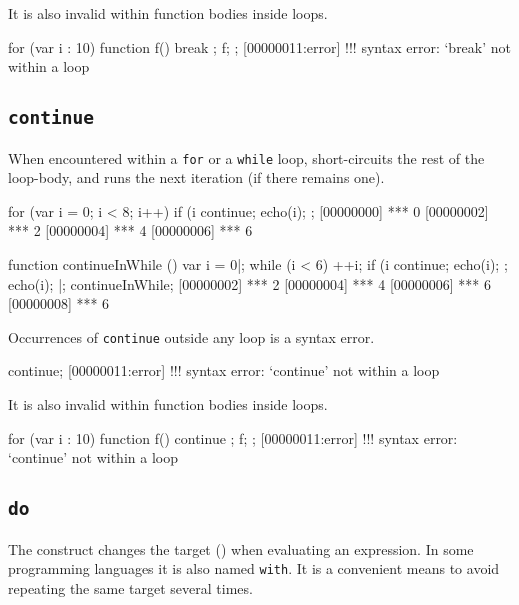 It is also invalid within function bodies inside loops.

\begin{urbiscript}
for (var i : 10)
{
  function f() { break };
  f;
};
[00000011:error] !!! syntax error: `break' not within a loop
\end{urbiscript}


\subsection{\lstinline{continue}}
\label{sec:lang:continue}

When encountered within a \lstinline{for} or a \lstinline{while} loop,
 short-circuits the rest of the loop-body, and runs the
next iteration (if there remains one).

\begin{urbiscript}
for (var i = 0; i < 8; i++)
{
  if (i %
    continue;
  echo(i);
};
[00000000] *** 0
[00000002] *** 2
[00000004] *** 4
[00000006] *** 6
\end{urbiscript}

\begin{urbiscript}
function continueInWhile ()
{
  var i = 0|;
  while (i < 6)
  {
    ++i;
    if (i %
      continue;
    echo(i);
  };
  echo(i);
}|;
continueInWhile;
[00000002] *** 2
[00000004] *** 4
[00000006] *** 6
[00000008] *** 6
\end{urbiscript}

Occurrences of \lstinline{continue} outside any loop is a syntax error.

\begin{urbiscript}
continue;
[00000011:error] !!! syntax error: `continue' not within a loop
\end{urbiscript}

It is also invalid within function bodies inside loops.

\begin{urbiscript}
for (var i : 10)
{
  function f() { continue };
  f;
};
[00000011:error] !!! syntax error: `continue' not within a loop
\end{urbiscript}

\subsection{\lstinline{do}}
\label{sec:lang:do}

The  construct changes the target (\this) when evaluating an
expression.  In some programming languages it is also named
\lstinline{with}.  It is a convenient means to avoid repeating the same
target several times.

